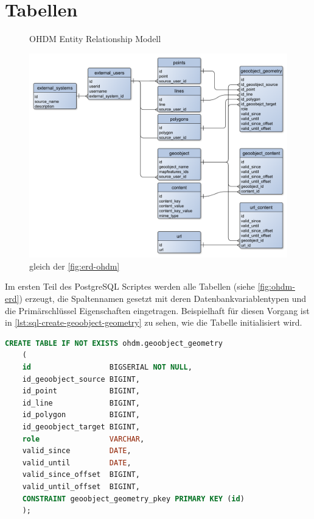 \section{Tabellen}
\begin{figure}[h]
	\caption{OHDM Entity Relationship Modell}
	\label{fig:ohdm-erd}
	\includegraphics[width=\linewidth]{img/ohdm-db-erd.pdf}
	\caption*{gleich der \autoref{fig:erd-ohdm}}
\end{figure}

Im ersten Teil des PostgreSQL Scriptes werden alle Tabellen (siehe \autoref{fig:ohdm-erd}) erzeugt, die Spaltennamen gesetzt mit deren Datenbankvariablentypen und die Primärschlüssel Eigenschaften eingetragen. Beispielhaft für diesen Vorgang ist in \autoref{lst:sql-create-geoobject-geometry} zu sehen, wie die Tabelle  initialisiert wird.\newpage

\begin{lstlisting}[language=SQL,caption={Erzeugung der \gequote{geoobject\_geometry} Tabelle},label={lst:sql-create-geoobject-geometry}]
	CREATE TABLE IF NOT EXISTS ohdm.geoobject_geometry
	(
	id                  BIGSERIAL NOT NULL,
	id_geoobject_source BIGINT,
	id_point            BIGINT,
	id_line             BIGINT,
	id_polygon          BIGINT,
	id_geoobject_target BIGINT,
	role                VARCHAR,
	valid_since         DATE,
	valid_until         DATE,
	valid_since_offset  BIGINT,
	valid_until_offset  BIGINT,
	CONSTRAINT geoobject_geometry_pkey PRIMARY KEY (id)
	);
\end{lstlisting}


